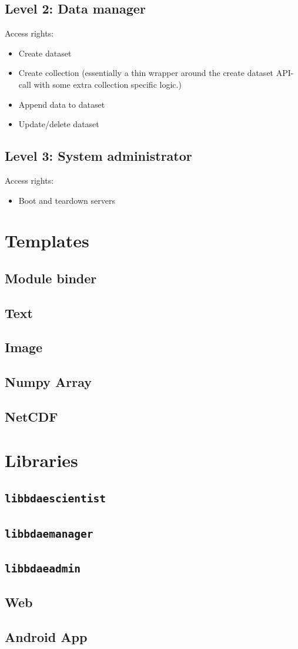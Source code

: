 \subsection{Level 2: Data manager}
Access rights:
\begin{itemize}
	\item Create dataset
	\item Create collection (essentially a thin wrapper around the create dataset API-call with some extra collection specific logic.)
	\item Append data to dataset
	\item Update/delete dataset
\end{itemize}

\subsection{Level 3: System administrator}
Access rights:
\begin{itemize}
	\item Boot and teardown servers
\end{itemize}

\section{Templates}
\subsection{Module binder}
\subsection{Text}
\subsection{Image}
\subsection{Numpy Array}
\subsection{NetCDF}

\section{Libraries}
\subsection{\texttt{libbdaescientist}}
\subsection{\texttt{libbdaemanager}}
\subsection{\texttt{libbdaeadmin}}
\subsection{Web}
\subsection{Android App} \label{sec:bdaeapp}